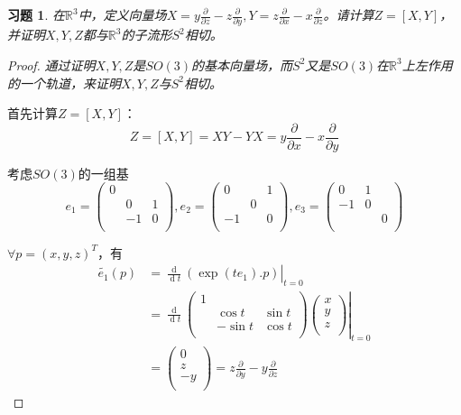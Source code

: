 \documentclass[winfonts,UTF8,c5size,a4paper,fancyhdr,hyperref,titlepage,nocap]{ctexart}
\newtheorem{xiti}{习题}
\theoremstyle{definition}
\theoremstyle{remark}
\numberwithin{equation}{subsection}
\newcommand{\Real}{\mathbb{R}}
\newcommand{\dt}{\frac{\operatorname{d}}{\operatorname{d}t}}
\newcommand{\pfrac}[2]{\frac{\partial{#1}}{\partial{#2}}}
\newcommand{\local}[2]{\left.{#1}\right|_{#2}}%
\newcommand{\localt}[1]{\local{#1}{t=0}}%
\begin{document}
\begin{xiti}
  在$\Real^3$中，定义向量场$X=y\pfrac{}{z}-z\pfrac{}{y},Y=z\pfrac{}{x}-x\pfrac{}{z}$。请计算$Z=[X,Y]$，并证明$X,Y,Z$都与$\Real^3$的子流形$S^2$相切。
\end{xiti}
\begin{proof}
  \emph{通过证明$X,Y,Z$是$SO(3)$的基本向量场，而$S^2$又是$SO(3)$在$\Real^3$上左作用的一个轨道，来证明$X,Y,Z$与$S^2$相切。}

  首先计算$Z=[X,Y]$：
  \begin{equation*}
  Z=[X,Y]=XY-YX=y\pfrac{}{x}-x\pfrac{}{y}
  \end{equation*}

  考虑$SO(3)$的一组基
  \begin{equation*}
    e_1=
         \begin{pmatrix}
           0 &  &  \\
            & 0 & 1 \\
            & -1 & 0 \\
         \end{pmatrix}
    ,  e_2=
         \begin{pmatrix}
           0 &  & 1 \\
            & 0 &  \\
           -1 &  & 0 \\
         \end{pmatrix}
    ,  e_3=
         \begin{pmatrix}
           0 & 1 &  \\
           -1 & 0 &  \\
            &  & 0 \\
         \end{pmatrix}
  \end{equation*}

  $\forall p=(x,y,z)^T$，有
  \begin{align*}
  \widetilde{e_1}(p)&=\localt{\dt(\exp(te_1).p)}\\
                  &=\localt{\dt
         \begin{pmatrix}
           1 &  &  \\
            & \cos t & \sin t \\
            & -\sin t & \cos t \\
         \end{pmatrix}
         \begin{pmatrix}
           x \\
           y \\
           z \\
         \end{pmatrix}}\\
                  &=
         \begin{pmatrix}
           0 \\
           z \\
           -y \\
         \end{pmatrix}=z\pfrac{}{y}-y\pfrac{}{z}
  \end{align*}


\end{proof}
\end{document}
